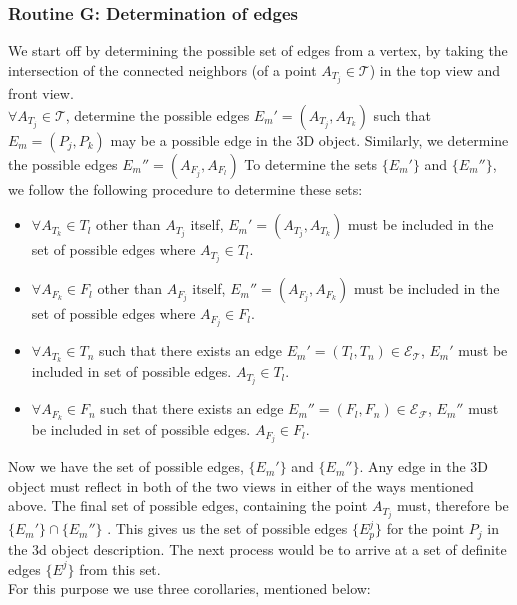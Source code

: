 \documentclass[12pt]{report}
\begin{document}
\subsubsection*{Routine G: Determination of edges}
We start off by determining the possible set of edges from a vertex, by taking the intersection of the connected neighbors (of a point \(A_{T_{j}} \in \mathcal{T} \)) in the top view and front view.\\
\(\forall A_{T_{j}} \in \mathcal{T} \), determine the possible edges \(E_{m}' = (A_{T_{j}},A_{T_{k}}) \) such that \(E_{m} = (P_{j},P_{k}) \) may be a possible edge in the 3D object. Similarly, we determine the possible edges \(E_{m}'' = (A_{F_{j}},A_{F_{l}}) \) To determine the sets \(\{E_{m}'\}\) and \(\{E_{m}''\}\), we follow the following procedure to determine these sets:
\begin{itemize}[nolistsep,noitemsep]
\item  \(\forall A_{T_{k}} \in T_{l}\) other than \(A_{T_{j}}\) itself, \(E_{m}' = (A_{T_{j}},A_{T_{k}})\) must be included in the set of possible edges where \(A_{T_{j}} \in T_{l}\).
\item  \(\forall A_{F_{k}} \in F_{l}\) other than \(A_{F_{j}}\) itself, \(E_{m}'' = (A_{F_{j}},A_{F_{k}})\) must be included in the set of possible edges where \(A_{F_{j}} \in F_{l}\).
\item \(\forall A_{T_{k}} \in T_{n}\) such that there exists an edge \(E_{m}' = (T_{l},T_{n}) \in \mathcal{E_{T}} \), \(E_{m}'\) must be included in set of possible edges. \(A_{T_{j}} \in T_{l}\).
\item \(\forall A_{F_{k}} \in F_{n}\) such that there exists an edge \(E_{m}'' = (F_{l},F_{n}) \in \mathcal{E_{F}} \), \(E_{m}''\) must be included in set of possible edges. \(A_{F_{j}} \in F_{l}\).
\end{itemize}
Now we have the set of possible edges, \(\{E_{m}'\}\) and \(\{E_{m}''\}\). Any edge in the 3D object must reflect in both of the two views in either of the ways mentioned above. The final set of possible edges, containing the point \(A_{T_{j}} \) must, therefore be \(\{E_{m}'\} \cap \{E_{m}''\}\) . This gives us the set of possible edges \(\{E_{p}^{j}\}\) for the point \(P_{j} \) in the 3d object description. The next process would be to arrive at a set of definite edges \(\{E^{j}\}\) from this set.\\
For this purpose we use three corollaries, mentioned below:
\end{document}
